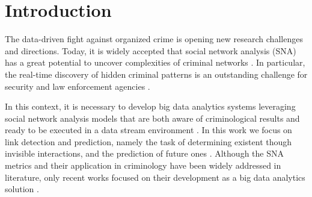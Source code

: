 \section{Introduction}
\label{sec:introduction}

The data-driven fight against organized crime is opening new research challenges and directions. 
Today, it is widely accepted that social network analysis (SNA) has a great potential to uncover complexities of criminal networks \cite{berlusconi2017social}.
In particular, the real-time discovery of hidden criminal patterns is an outstanding challenge for security and law enforcement agencies \cite{berlusconi2016link}.

In this context, it is necessary to develop big data analytics systems leveraging social network analysis models that are both aware of criminological results and ready to be executed in a data stream environment \cite{xu2005criminal,xu2004analyzing}.
In this work we focus on link detection and prediction, namely the task of determining existent though invisible interactions, and the prediction of future ones \cite{Hasan2011}.
Although the SNA metrics and their application in criminology have been widely addressed in literature, only recent works focused on their development as a big data analytics solution \cite{pramanik2016framework}.

 


